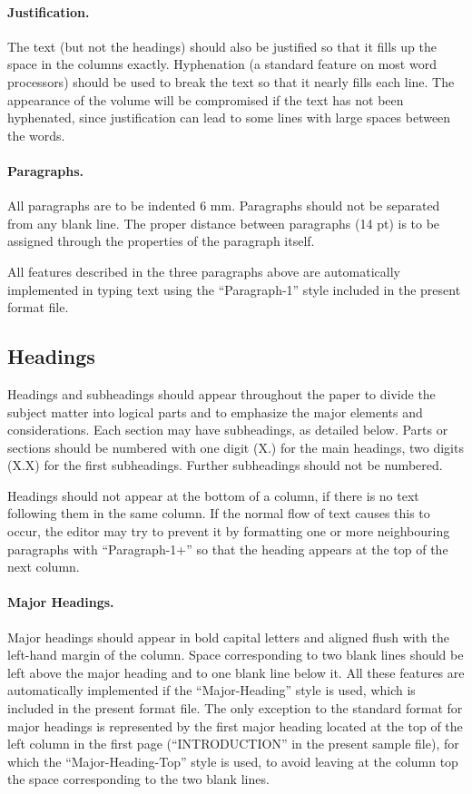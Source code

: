 \documentclass{stabs2021}
\begin{document}
\paragraph{Justification.}

The text (but not the headings) should also be justified so that it
fills up the space in the columns exactly. Hyphenation (a standard
feature on most word processors) should be used to break the text so
that it nearly fills each line. The appearance of the volume will be
compromised if the text has not been hyphenated, since justification
can lead to some lines with large spaces between the words.

\paragraph{Paragraphs.}

All paragraphs are to be indented 6 mm. Paragraphs should not be
separated from any blank line. The proper distance between paragraphs
(14 pt) is to be assigned through the properties of the paragraph
itself.

All features described in the three paragraphs above are
automatically implemented in typing text using the ``Paragraph-1''
style included in the present format file.

\subsection{Headings}

Headings and subheadings should appear throughout the paper to divide
the subject matter into logical parts and to emphasize the major
elements and considerations. Each section may have subheadings, as
detailed below. Parts or sections should be numbered with one digit
(X.) for the main headings, two digits (X.X) for the first
subheadings. Further subheadings should not be numbered.

Headings should not appear at the bottom of a column, if there is no
text following them in the same column. If the normal flow of text
causes this to occur, the editor may try to prevent it by formatting
one or more neighbouring paragraphs with ``Paragraph-1+'' so that the
heading appears at the top of the next column.

\paragraph{Major Headings.}

Major headings should appear in bold capital letters and aligned flush
with the left-hand margin of the column. Space corresponding to two
blank lines should be left above the major heading and to one blank
line below it. All these features are automatically implemented if the
``Major-Heading'' style is used, which is included in the present
format file. The only exception to the standard format for major
headings is represented by the first major heading located at the top
of the left column in the first page (``INTRODUCTION'' in the present
sample file), for which the ``Major-Heading-Top'' style is used, to
avoid leaving at the column top the space corresponding to the two
blank lines.
\end{document}
